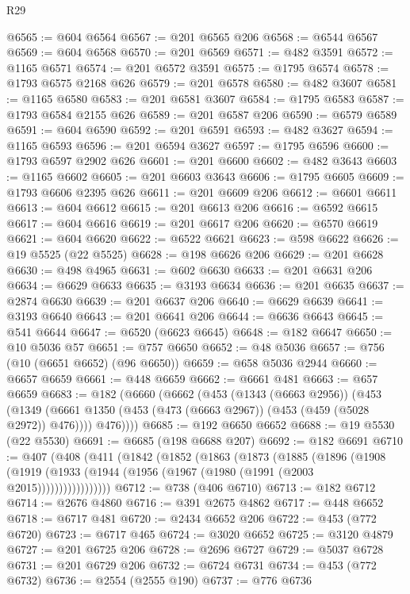 \begin{lexlean}{R29}
\begin{coremodule}
@6565 := @604 @6564
@6567 := @201 @6565 @206
@6568 := @6544 @6567
@6569 := @604 @6568
@6570 := @201 @6569
@6571 := @482 @3591
@6572 := @1165 @6571
@6574 := @201 @6572 @3591
@6575 := @1795 @6574
@6578 := @1793 @6575 @2168 @626
@6579 := @201 @6578
@6580 := @482 @3607
@6581 := @1165 @6580
@6583 := @201 @6581 @3607
@6584 := @1795 @6583
@6587 := @1793 @6584 @2155 @626
@6589 := @201 @6587 @206
@6590 := @6579 @6589
@6591 := @604 @6590
@6592 := @201 @6591
@6593 := @482 @3627
@6594 := @1165 @6593
@6596 := @201 @6594 @3627
@6597 := @1795 @6596
@6600 := @1793 @6597 @2902 @626
@6601 := @201 @6600
@6602 := @482 @3643
@6603 := @1165 @6602
@6605 := @201 @6603 @3643
@6606 := @1795 @6605
@6609 := @1793 @6606 @2395 @626
@6611 := @201 @6609 @206
@6612 := @6601 @6611
@6613 := @604 @6612
@6615 := @201 @6613 @206
@6616 := @6592 @6615
@6617 := @604 @6616
@6619 := @201 @6617 @206
@6620 := @6570 @6619
@6621 := @604 @6620
@6622 := @6522 @6621
@6623 := @598 @6622
@6626 := @19 @5525 (@22 @5525)
@6628 := @198 @6626 @206
@6629 := @201 @6628
@6630 := @498 @4965
@6631 := @602 @6630
@6633 := @201 @6631 @206
@6634 := @6629 @6633
@6635 := @3193 @6634
@6636 := @201 @6635
@6637 := @2874 @6630
@6639 := @201 @6637 @206
@6640 := @6629 @6639
@6641 := @3193 @6640
@6643 := @201 @6641 @206
@6644 := @6636 @6643
@6645 := @541 @6644
@6647 := @6520 (@6623 @6645)
@6648 := @182 @6647
@6650 := @10 @5036 @57
@6651 := @757 @6650
@6652 := @48 @5036
@6657 := @756 (@10 (@6651 @6652) (@96 @6650))
@6659 := @658 @5036 @2944
@6660 := @6657 @6659
@6661 := @448 @6659
@6662 := @6661 @481
@6663 := @657 @6659
@6683 := @182
    (@6660
      (@6662
        (@453
          (@1343 (@6663 @2956))
          (@453
            (@1349 (@6661 @1350 (@453 (@473 (@6663 @2967)) (@453 (@459 (@5028 @2972)) @476))))
            @476))))
@6685 := @192 @6650 @6652
@6688 := @19 @5530 (@22 @5530)
@6691 := @6685 (@198 @6688 @207)
@6692 := @182 @6691
@6710 := @407
    (@408
      (@411
        (@1842
          (@1852
            (@1863
              (@1873
                (@1885
                  (@1896
                    (@1908
                      (@1919 (@1933 (@1944 (@1956 (@1967 (@1980 (@1991 (@2003 @2015)))))))))))))))))
@6712 := @738 (@406 @6710)
@6713 := @182 @6712
@6714 := @2676 @4860
@6716 := @391 @2675 @4862
@6717 := @448 @6652
@6718 := @6717 @481
@6720 := @2434 @6652 @206
@6722 := @453 (@772 @6720)
@6723 := @6717 @465
@6724 := @3020 @6652
@6725 := @3120 @4879
@6727 := @201 @6725 @206
@6728 := @2696 @6727
@6729 := @5037 @6728
@6731 := @201 @6729 @206
@6732 := @6724 @6731
@6734 := @453 (@772 @6732)
@6736 := @2554 (@2555 @190)
@6737 := @776 @6736

\end{coremodule}
\end{lexlean}
